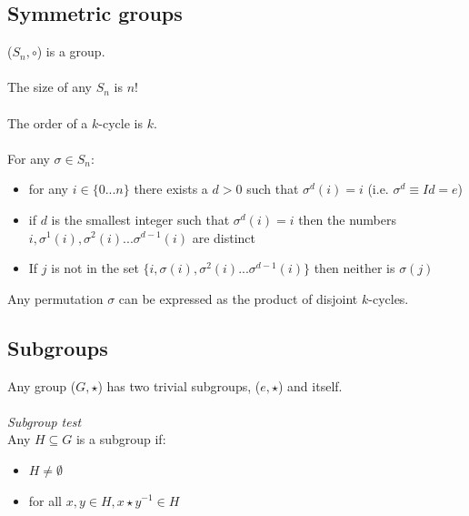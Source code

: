 \documentclass{article}
\begin{document}
\subsection{Symmetric groups}
($ S_{n}, \circ $) is a group.
\\\\
The size of any $ S_{n} $ is $ n! $
\\\\
The order of a $ k $-cycle  is $ k $.
\\\\
For any $ \sigma \in S_{n} $:
\begin{itemize}
\item for any $ i \in \{0...n\} $ there exists a $ d  > 0 $ such that $ \sigma^{d}(i) = i $ (i.e. $ \sigma^{d} \equiv Id = e $)
\item if $ d $ is the smallest integer such that $ \sigma^{d}(i) = i $ then the numbers $ i, \sigma^{1}(i), \sigma^{2}(i) ... \sigma^{d - 1}(i) $ are distinct
\item If $ j $ is not in the set $ \{i, \sigma(i), \sigma^{2}(i)...\sigma^{d - 1}(i)\} $ then neither is $ \sigma(j) $
\end{itemize}
Any permutation $ \sigma $ can be expressed as the product of disjoint $ k $-cycles.

\subsection{Subgroups}
Any group ($ G, \star $) has two trivial subgroups, ($ e, \star $) and itself.
\\\\
\textit{Subgroup test}
\\
Any $ H \subseteq G $ is a subgroup if:
\begin{itemize}
\item $ H \neq \emptyset $
\item for all $ x, y \in H, x \star y^{-1} \in H $
\end{itemize}
\end{document}
